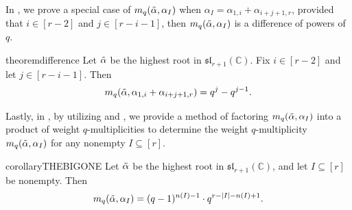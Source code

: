 \documentclass[10pt]{article}
\newcommand{\speclin}[0]{\mathfrak{sl}_{r+1}(\mathbb{C})}
\newcommand{\hr}[0]{\Tilde{\alpha}}
\begin{document}
In , we prove a special case of $m_q(\hr,\alpha_I)$ when $\alpha_I=\alpha_{1,i}+\alpha_{i+j+1,r}$, provided that $i\in[r-2]$ and $j\in[r-i-1]$, then $m_q(\hr,\alpha_I)$ is a difference of powers of $q$. 
\begin{restatable*}[]{theorem}{difference}\label{thm: difference of q's}
    Let $\hr$ be the highest root in $\speclin$. 
    Fix  $i \in [r-2]$ and let $j\in[r-i-1]$.  
    Then
    \begin{equation}
        m_q(\hr,\alpha_{1,i}+\alpha_{i+j+1,r})=q^j-q^{j-1}.\notag
    \end{equation}
\end{restatable*}
Lastly, in , by utilizing  and  
, we provide a method of factoring $m_q(\hr,\alpha_I)$ into a product of weight $q$-multiplicities to determine the weight $q$-multiplicity $m_q(\hr,\alpha_I)$ for any nonempty $I\subseteq [r]$.
\begin{restatable*}[]{corollary}{THEBIGONE}\label{thm: the big one}
    Let $\hr$ be the highest root in $\speclin$, and let $I\subseteq[r]$ be nonempty.
    Then
    \begin{equation}
        m_q(\hr,\alpha_I)=(q-1)^{n(I)-1}\cdot q^{r-|I|-n(I)+1}.\label{eq: KWMF final poly}
    \end{equation}
\end{restatable*}
\end{document}
